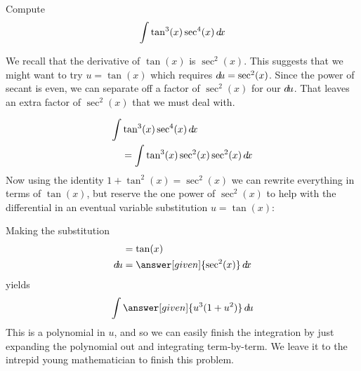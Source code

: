 \documentclass{ximera}
\begin{document}
\begin{example}
  Compute
  \[
  \int \tan^3(x) \sec^4(x) \mathop{}\!d\! x
  \]
  \begin{explanation}
    We recall that the derivative of $\tan(x)$ is $\sec^{2}(x)$. This suggests that we might want to try $u=\tan(x)$ which requires 
    $\mathop{}\!d\! u=\sec^{2}(x)$. 
    Since the power of secant is even, we can separate off a factor of $\sec^{2}(x)$ for our $\mathop{}\!d\! u$. That leaves an extra factor
    of $\sec^{2}(x)$ that we must deal with. 

    \begin{align*}
    \int &\tan^3(x) \sec^4(x) \mathop{}\!d\! x \\
    &= \int\tan^3(x) \sec^2(x) \sec^2(x) \mathop{}\!d\! x
    \end{align*}
    Now using the identity $1+\tan^{2}(x)=\sec^{2}(x)$ we can rewrite everything in
    terms of $\tan(x)$, but reserve the one power of $\sec^2(x)$ to help
    with the differential in an eventual variable substitution $u=\tan(x)$:
    \begin{center}%
    \end{center}
    Making the substitution
    \begin{align*}
       &= \tan(x)\\
      \d u &=\answer[given]{\sec^2(x)} \d x
    \end{align*}
    yields
    \[
    \int \answer[given]{u^3(1+u^2)} \d u
    \]
    This is a polynomial in $u$, and so we can easily finish the
    integration by just expanding the polynomial out and integrating
    term-by-term. We leave it to the intrepid young mathematician to
    finish this problem.
  \end{explanation}
\end{example}

%
%
%
%
%
%
%
%
\end{document}
